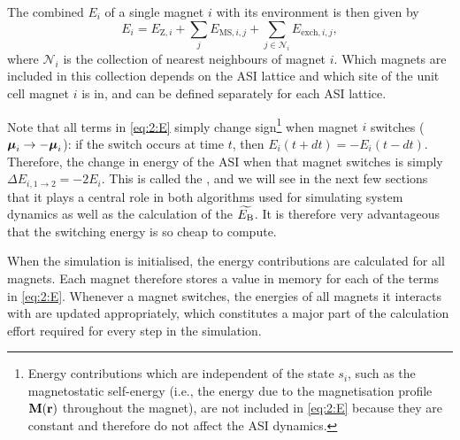 The combined  $E_i$ of a single magnet $i$ with its environment is then given by
\begin{equation}
	\label{eq:2:E}
	E_i = E_{\mathrm{Z},i} + \sum_j E_{\mathrm{MS},i,j} + \sum_{j \in \mathcal{N}_i} E_{\mathrm{exch},i,j} \mathrm{,}
\end{equation}
where $\mathcal{N}_i$ is the collection of nearest neighbours of magnet $i$.
Which magnets are included in this collection depends on the ASI lattice and which site of the unit cell magnet $i$ is in, and can be defined separately for each ASI lattice. \par
Note that all terms in \cref{eq:2:E} simply change sign\footnote{
	Energy contributions which are independent of the state $s_i$, such as the magnetostatic self-energy (i.e., the energy due to the magnetisation profile $\boldsymbol{\mathbf{M}}(\boldsymbol{\mathbf{r}})$ throughout the magnet), are not included in \cref{eq:2:E} because they are constant and therefore do not affect the ASI dynamics.
} when magnet $i$ switches ($\boldsymbol{\mathbf{\mu}}_i \rightarrow -\boldsymbol{\mathbf{\mu}}_i$): if the switch occurs at time $t$, then $E_i(t + dt) = -E_i(t - dt)$.
Therefore, the change in energy of the ASI when that magnet switches is simply $\Delta E_{i,1\rightarrow2} = -2 E_i$.
This is called the , and we will see in the next few sections that it plays a central role in both algorithms used for simulating system dynamics as well as the calculation of the  $\widetilde{E_\mathrm{B}}$.
It is therefore very advantageous that the switching energy is so cheap to compute. \par
When the simulation is initialised, the energy contributions are calculated for all magnets.
Each magnet therefore stores a value in memory for each of the terms in \cref{eq:2:E}.
Whenever a magnet switches, the energies of all magnets it interacts with are updated appropriately, which constitutes a major part of the calculation effort required for every step in the simulation.

